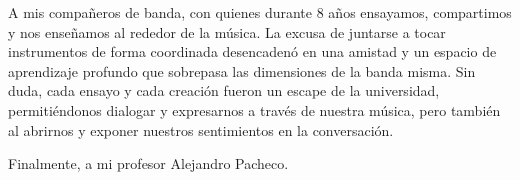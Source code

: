 A mis compañeros de banda, con quienes durante 8 años ensayamos, compartimos y nos enseñamos al rededor de la música. La excusa de juntarse a tocar instrumentos de forma coordinada desencadenó en una amistad y un espacio de aprendizaje profundo que sobrepasa las dimensiones de la banda misma. Sin duda, cada ensayo y cada creación fueron un escape de la universidad, permitiéndonos dialogar y expresarnos a través de nuestra música, pero también al abrirnos y exponer nuestros sentimientos en la conversación.

Finalmente, a mi profesor Alejandro Pacheco.
